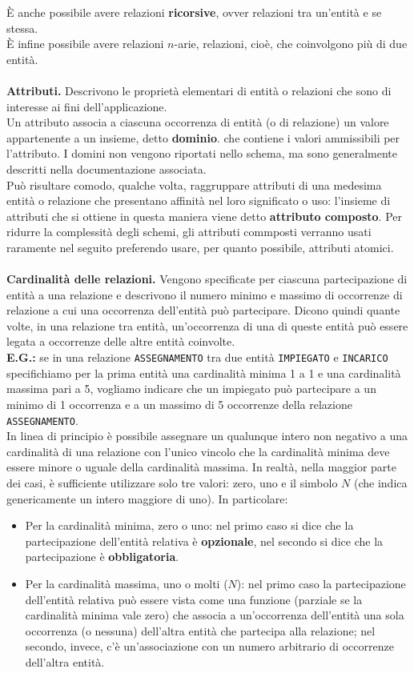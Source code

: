 È anche possibile avere relazioni \textbf{ricorsive}, ovver relazioni tra un'entità e se stessa.\\
È infine possibile avere relazioni $n$-arie, relazioni, cioè, che coinvolgono più di due entità.\\\\
\textbf{Attributi.} Descrivono le proprietà elementari di entità o relazioni che sono di interesse ai fini dell'applicazione.\\
Un attributo associa a ciascuna occorrenza di entità (o di relazione) un valore appartenente a un insieme, detto \textbf{dominio}. che contiene i valori ammissibili per l'attributo. I domini non vengono riportati nello schema, ma sono generalmente descritti nella documentazione associata.\\
Può risultare comodo, qualche volta, raggruppare attributi di una medesima entità o relazione che presentano affinità nel loro significato o uso: l'insieme di attributi che si ottiene in questa maniera viene detto \textbf{attributo composto}. Per ridurre la complessità degli schemi, gli attributi commposti verranno usati raramente nel seguito preferendo usare, per quanto possibile, attributi atomici.\\\\
\textbf{Cardinalità delle relazioni.} Vengono specificate per ciascuna partecipazione di entità a una relazione e descrivono il numero minimo e massimo di occorrenze di relazione a cui una occorrenza dell'entità può partecipare. Dicono quindi quante volte, in una relazione tra entità, un'occorrenza di una di queste entità può essere legata a occorrenze delle altre entità coinvolte.\\
\textbf{E.G.:} se in una relazione \texttt{ASSEGNAMENTO} tra due entità \texttt{IMPIEGATO} e \texttt{INCARICO} specifichiamo per la prima entità una cardinalità minima 1 a 1 e una cardinalità massima pari a 5, vogliamo indicare che un impiegato può partecipare a un minimo di 1 occorrenza e a un massimo di 5 occorrenze della relazione \texttt{ASSEGNAMENTO}.\\
In linea di principio è possibile assegnare un qualunque intero non negativo a una cardinalità di una relazione con l'unico vincolo che la cardinalità minima deve essere minore o uguale della cardinalità massima. In realtà, nella maggior parte dei casi, è sufficiente utilizzare solo tre valori: zero, uno e il simbolo $N$ (che indica genericamente un intero maggiore di uno). In particolare:
    \begin{itemize}
        \item{Per la cardinalità minima, zero o uno: nel primo caso si dice che la partecipazione dell'entità relativa è \textbf{opzionale}, nel secondo si dice che la partecipazione è \textbf{obbligatoria}.}
        \item{Per la cardinalità massima, uno o molti ($N$): nel primo caso la partecipazione dell'entità relativa può essere vista come una funzione (parziale se la cardinalità minima vale zero) che associa a un'occorrenza dell'entità una sola occorrenza (o nessuna) dell'altra entità che partecipa alla relazione; nel secondo, invece, c'è un'associazione con un numero arbitrario di occorrenze dell'altra entità.}    
    \end{itemize}

